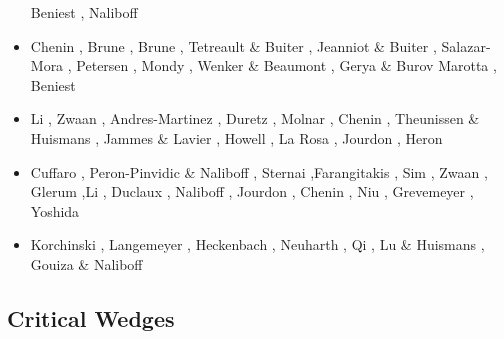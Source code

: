 \begin{scriptsize}
\begin{itemize}
                       Beniest \etal \cite{bekb17}, Naliboff \etal \cite{nabp17}
\item[\twothousandeighteen] Chenin \etal \cite{chsm18}, Brune \etal \cite{brwm18},
                      Brune \cite{brun18}, Tetreault \& Buiter \cite{tebu18},
                      Jeanniot \& Buiter \cite{jebu18}, Salazar-Mora \etal \cite{sahf18},
                      Petersen \etal \cite{pesn18}, Mondy \etal \cite{mord18},
                      Wenker \& Beaumont \cite{webe18,webe18b},
                      Gerya \& Burov \cite{gebu18} Marotta \etal \cite{marc18},
                      Beniest \etal \cite{bews18} 
\item[\twothousandnineteen] Li \etal \cite{lisp19}, Zwaan \etal \cite{zwsb19}, 
                      Andres-Martinez \etal \cite{anpa19}, Duretz \etal \cite{dual19},
                      Molnar \etal \cite{mocb19}, Chenin \etal \cite{chmd19},
                      Theunissen \& Huismans \cite{thhu19}, Jammes \& Lavier \cite{jala19},
                      Howell \etal \cite{hooi19}, La Rosa \etal \cite{lapk19}, 
                      Jourdon \etal \cite{jolm19}, Heron \etal \cite{hepm19}
\item[\twothousandtwenty] Cuffaro \etal \cite{cump20}, Peron-Pinvidic \& Naliboff \cite{pena20}, 
                          Sternai \cite{ster20},Farangitakis \etal \cite{fahm20}, Sim \etal \cite{siss20}, 
                          Zwaan \etal \cite{zwsr20}, Glerum \etal \cite{glbs20},Li \etal \cite{lial20}, 
                          Duclaux \etal \cite{duhm20}, Naliboff \etal \cite{nagb20}, 
                          Jourdon \etal \cite{jolm20}, Chenin \etal \cite{chsm20}, 
                          Niu \cite{niu20}, Grevemeyer \etal \cite{grrm21}, Yoshida \etal \cite{yosy20b}
\item[\twothousandtwentyone] Korchinski \etal \cite{kotr21}, Langemeyer \etal \cite{lalt21},
                             Heckenbach \etal \cite{hebg21}, Neuharth \etal \cite{nebg21},
                             Qi \etal \cite{qill21}, Lu \& Huismans \cite{luhu21},
                             Gouiza \& Naliboff \cite{gona21}
\end{itemize}
\end{scriptsize}

\subsection{Critical Wedges}

